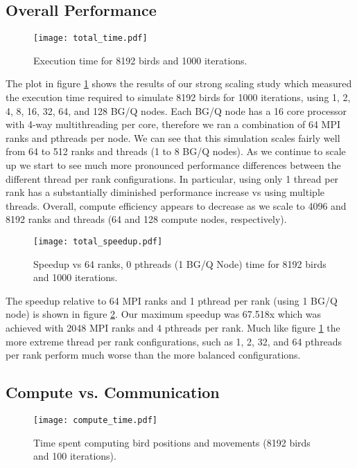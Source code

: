 \subsection*{Overall Performance}

\begin{figure}[h!]
  \centering
  \texttt{[image: total\_time.pdf]}
  \caption{Execution time for 8192 birds and 1000 iterations.\label{fig:total}}
\end{figure}

The plot in figure \ref{fig:total} shows the results of our strong scaling study which
measured the execution time required to simulate 8192 birds for 1000 iterations,
using 1, 2, 4, 8, 16, 32, 64, and 128 BG/Q nodes. Each BG/Q node has a 16
core processor with 4-way multithreading per core, therefore we ran a combination
of 64 MPI ranks and pthreads per node. We can see that this simulation scales
fairly well from 64 to 512 ranks and threads (1 to 8 BG/Q nodes). As we continue to
scale up we start to see much more pronounced performance differences between
the different thread per rank configurations. In particular, using only 1 thread
per rank has a substantially diminished performance increase vs using multiple
threads. Overall, compute efficiency appears to decrease as we scale to 4096 and
8192 ranks and threads (64 and 128 compute nodes, respectively).

\begin{figure}[h!]
  \centering
  \texttt{[image: total\_speedup.pdf]}
  \caption{Speedup vs 64 ranks, 0 pthreads (1 BG/Q Node) time for 8192 birds and 1000 iterations.\label{fig:totalspeedup}}
\end{figure}

The speedup relative to 64 MPI ranks and 1 pthread per rank (using 1 BG/Q node)
is shown in figure \ref{fig:totalspeedup}. Our maximum speedup was 67.518x which was
achieved with 2048 MPI ranks and 4 pthreads per rank. Much like figure \ref{fig:total}
the more extreme thread per rank configurations, such as 1, 2, 32, and 64 pthreads
per rank perform much worse than the more balanced configurations.

\subsection*{Compute vs. Communication}

\begin{figure}[h!]
  \centering
  \texttt{[image: compute\_time.pdf]}
  \caption{Time spent computing bird positions and movements (8192 birds and 100 iterations).\label{fig:compute}}
\end{figure}

